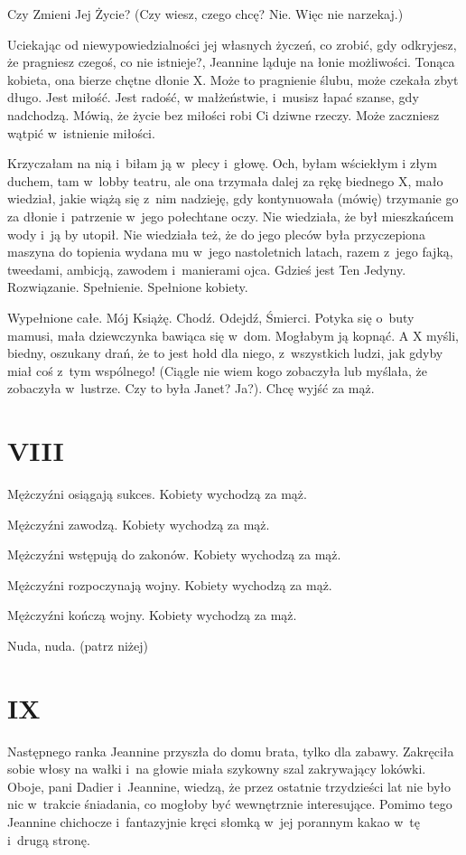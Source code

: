 \documentclass[oneside,polish,12pt,sfheadings]{mwbk}
\begin{document}
Czy Zmieni Jej Życie? (Czy wiesz, czego chcę? Nie. Więc nie narzekaj.)

Uciekając od niewypowiedzialności jej własnych życzeń, co zrobić,
gdy odkryjesz, że pragniesz czegoś, co nie istnieje?, Jeannine ląduje
na łonie możliwości. Tonąca kobieta, ona bierze chętne dłonie X. Może
to pragnienie ślubu, może czekała zbyt długo. Jest miłość. Jest radość,
w małżeństwie, i~musisz łapać szanse, gdy nadchodzą. Mówią, że życie
bez miłości robi Ci dziwne rzeczy. Może zaczniesz wątpić w~istnienie
miłości.

Krzyczałam na nią i~biłam ją w~plecy i~głowę. Och, byłam wściekłym
i złym duchem, tam w~lobby teatru, ale ona trzymała dalej za rękę
biednego X, mało wiedział, jakie wiążą się z~nim nadzieję, gdy kontynuowała
(mówię) trzymanie go za dłonie i~patrzenie w~jego połechtane oczy.
Nie wiedziała, że był mieszkańcem wody i~ją by utopił. Nie wiedziała
też, że do jego pleców była przyczepiona maszyna do topienia wydana
mu w~jego nastoletnich latach, razem z~jego fajką, tweedami, ambicją,
zawodem i~manierami ojca. Gdzieś jest Ten Jedyny. Rozwiązanie. Spełnienie.
Spełnione kobiety.

Wypełnione całe. Mój Książę. Chodź. Odejdź, Śmierci. Potyka się o~buty mamusi, mała dziewczynka bawiąca się w~dom. Mogłabym ją kopnąć.
A X myśli, biedny, oszukany drań, że to jest hołd dla niego, z~wszystkich
ludzi, jak gdyby miał coś z~tym wspólnego! (Ciągle nie wiem kogo zobaczyła
lub myślała, że zobaczyła w~lustrze. Czy to była Janet? Ja?). Chcę
wyjść za mąż.

\chapter{VIII}

Mężczyźni osiągają sukces. Kobiety wychodzą za mąż.

Mężczyźni zawodzą. Kobiety wychodzą za mąż.

Mężczyźni wstępują do zakonów. Kobiety wychodzą za mąż.

Mężczyźni rozpoczynają wojny. Kobiety wychodzą za mąż.

Mężczyźni kończą wojny. Kobiety wychodzą za mąż.

Nuda, nuda. (patrz niżej)

\chapter{IX}

Następnego ranka Jeannine przyszła do domu brata, tylko dla zabawy.
Zakręciła sobie włosy na wałki i~na głowie miała szykowny szal zakrywający
lokówki. Oboje, pani Dadier i~Jeannine, wiedzą, że przez ostatnie trzydzieści lat nie było
nic w~trakcie śniadania, co mogłoby być wewnętrznie interesujące.
Pomimo tego Jeannine chichocze i~fantazyjnie kręci słomką w~jej porannym
kakao w~tę i~drugą stronę.
\end{document}
